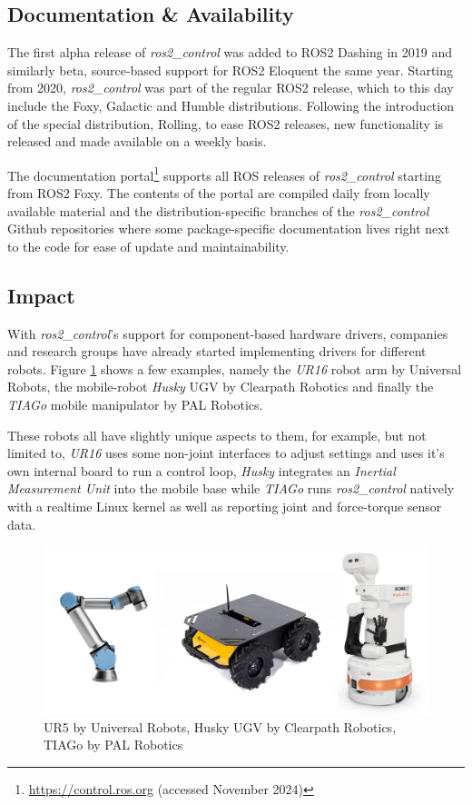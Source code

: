 \documentclass[journal]{IEEEtran}
\begin{document}
\subsection{Documentation \& Availability}

The first alpha release of \emph{ros2\_control} was added to ROS2 Dashing in 2019 and similarly beta, source-based support for ROS2 Eloquent the same year. Starting from 2020, \emph{ros2\_control} was part of the regular ROS2 release, which to this day include the Foxy, Galactic and Humble distributions. Following the introduction of the special distribution, Rolling, to ease ROS2 releases, new functionality is released and made available on a weekly basis.

The documentation portal\footnote{\url{https://control.ros.org} (accessed November 2024)} supports all ROS releases of \emph{ros2\_control} starting from ROS2 Foxy. The contents of the portal are compiled daily from locally available material and the distribution-specific branches of the \emph{ros2\_control} Github repositories where some package-specific documentation lives right next to the code for ease of update and maintainability.

\subsection{Impact}

With \emph{ros2\_control}'s support for component-based hardware drivers, companies and research groups have already started implementing drivers for different robots. Figure \ref{fig:supported-robots-example} shows a few examples, namely the \emph{UR16} robot arm by Universal Robots, the mobile-robot \emph{Husky} UGV by Clearpath Robotics and finally the \emph{TIAGo} mobile manipulator by PAL Robotics.

These robots all have slightly unique aspects to them, for example, but not limited to, \emph{UR16} uses some non-joint interfaces to adjust settings and uses it's own internal board to run a control loop, \emph{Husky} integrates an \emph{Inertial Measurement Unit} into the mobile base while \emph{TIAGo} runs \emph{ros2\_control} natively with a realtime Linux kernel as well as reporting joint and force-torque sensor data.

\begin{figure}
    \centering
    \includegraphics[width=\columnwidth]{figures/robots-collage}
    \caption{UR5 by Universal Robots, Husky UGV by Clearpath Robotics, TIAGo by PAL Robotics}
    \label{fig:supported-robots-example}
\end{figure}
\end{document}

